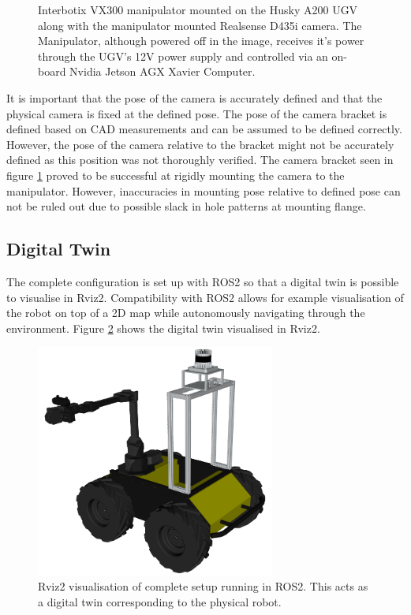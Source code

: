 \begin{figure}[ht]
\begin{minipage}[b]{0.49\textwidth}
  \end{minipage}
  \caption{Interbotix VX300 manipulator mounted on the Husky A200 UGV along with the manipulator mounted Realsense D435i camera. The Manipulator, although powered off in the image, receives it's power through the UGV's 12V power supply and controlled via an on-board Nvidia Jetson AGX Xavier Computer.}
  \label{fig:R&D:H:M:M:MMC:Vx300Complete}
\end{figure}

It is important that the pose of the camera is accurately defined and that the physical camera is fixed at the defined pose. The pose of the camera bracket is defined based on CAD measurements and can be assumed to be defined correctly. However, the pose of the camera relative to the bracket might not be accurately defined as this position was not thoroughly verified. The camera bracket seen in figure \ref{fig:R&D:H:M:M:MMC:Vx300Complete} proved to be successful at rigidly mounting the camera to the manipulator. However, inaccuracies in mounting pose relative to defined pose can not be ruled out due to possible slack in hole patterns at mounting flange.

\subsection{Digital Twin}
The complete configuration is set up with ROS2 so that a digital twin is possible to visualise in Rviz2. Compatibility with ROS2 allows for example visualisation of the robot on top of a 2D map while autonomously navigating through the environment. Figure \ref{fig:R&D:H:DigitalTwin:DigitalTwin} shows the digital twin visualised in Rviz2.

\begin{figure}[ht]
  \centering
  \includegraphics[width = 0.7\textwidth]{Figures/figDigitalTwin.png}
  \caption{Rviz2 visualisation of complete setup running in ROS2. This acts as a digital twin corresponding to the physical robot.}
  \label{fig:R&D:H:DigitalTwin:DigitalTwin}
\end{figure}

